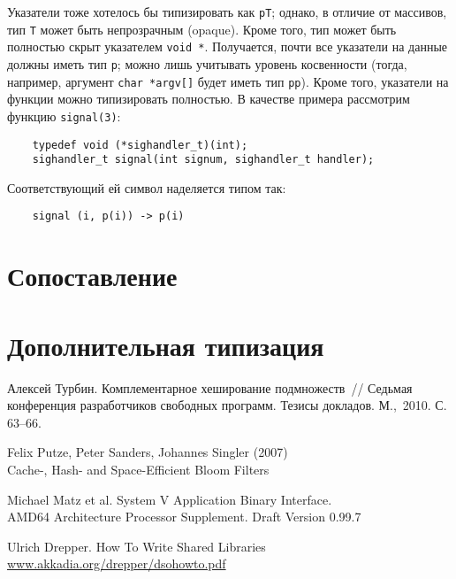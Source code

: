 \documentclass[russian,a4paper,12pt]{article}
\begin{document}
Указатели тоже хотелось бы типизировать как \verb|pT|; однако, в отличие от массивов,
тип \verb|T| может быть непрозрачным (opaque).  Кроме того, тип может быть полностью
скрыт указателем \verb|void *|.  Получается, почти все указатели на данные должны
иметь тип \verb|p|; можно лишь учитывать уровень косвенности (тогда, например,
аргумент \verb|char *argv[]| будет иметь тип \verb|pp|).  Кроме того, указатели
на функции можно типизировать полностью.  В качестве примера рассмотрим
функцию \verb|signal(3)|:
\begin{verbatim}
    typedef void (*sighandler_t)(int);
    sighandler_t signal(int signum, sighandler_t handler);
\end{verbatim}
Соответствующий ей символ наделяется типом так:
\begin{verbatim}
    signal (i, p(i)) -> p(i)
\end{verbatim}
\begin{comment}
Это что же получается если бы handler возвращал значение, то было бы две стрелки,
потипа right associative?  И точно ли никакой глупости не может быть с этими стрелками?
\end{comment}

\section{Сопоставление}
\section{Дополнительная типизация}

\begin{thebibliography}{9}

Алексей Турбин.  Комплементарное хеширование подмножеств~//
Седьмая конференция разработчиков свободных программ.
Тезисы докладов. М.,~2010. С.\,63--66.

Felix Putze, Peter Sanders, Johannes Singler (2007)\\
Cache-, Hash- and Space-Efficient Bloom Filters

Michael Matz et al.  System V Application Binary Interface.\\
AMD64 Architecture Processor Supplement.  Draft Version 0.99.7

Ulrich Drepper. How To Write Shared Libraries\\
\url{www.akkadia.org/drepper/dsohowto.pdf}

\end{thebibliography}
\end{document}

